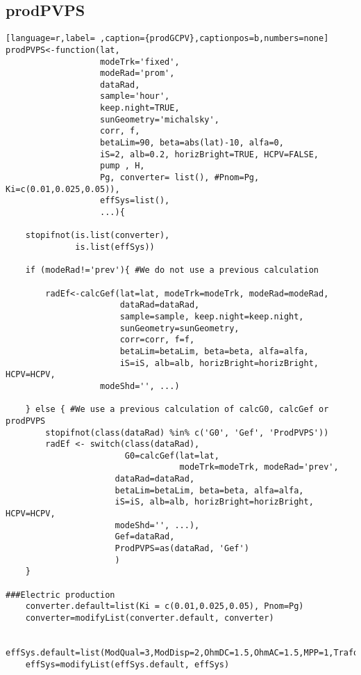 \subsection{prodPVPS}
\label{sec:org78cfe13}
\label{subsec:prodpvps}
\begin{lstlisting}[language=r,label= ,caption={prodGCPV},captionpos=b,numbers=none]
prodPVPS<-function(lat, 
                   modeTrk='fixed', 
                   modeRad='prom', 
                   dataRad,
                   sample='hour',
                   keep.night=TRUE,
                   sunGeometry='michalsky',
                   corr, f,
                   betaLim=90, beta=abs(lat)-10, alfa=0,
                   iS=2, alb=0.2, horizBright=TRUE, HCPV=FALSE,
                   pump , H, 
                   Pg, converter= list(), #Pnom=Pg, Ki=c(0.01,0.025,0.05)),
                   effSys=list(),
                   ...){

    stopifnot(is.list(converter),
              is.list(effSys))

    if (modeRad!='prev'){ #We do not use a previous calculation

        radEf<-calcGef(lat=lat, modeTrk=modeTrk, modeRad=modeRad,
                       dataRad=dataRad,
                       sample=sample, keep.night=keep.night,
                       sunGeometry=sunGeometry,
                       corr=corr, f=f,
                       betaLim=betaLim, beta=beta, alfa=alfa,
                       iS=iS, alb=alb, horizBright=horizBright, HCPV=HCPV,
                   modeShd='', ...)

    } else { #We use a previous calculation of calcG0, calcGef or prodPVPS
        stopifnot(class(dataRad) %in% c('G0', 'Gef', 'ProdPVPS'))
        radEf <- switch(class(dataRad),
                        G0=calcGef(lat=lat, 
                                   modeTrk=modeTrk, modeRad='prev',
                      dataRad=dataRad,
                      betaLim=betaLim, beta=beta, alfa=alfa,
                      iS=iS, alb=alb, horizBright=horizBright, HCPV=HCPV,
                      modeShd='', ...),
                      Gef=dataRad,
                      ProdPVPS=as(dataRad, 'Gef')
                      )
    }

###Electric production
    converter.default=list(Ki = c(0.01,0.025,0.05), Pnom=Pg)
    converter=modifyList(converter.default, converter)

    effSys.default=list(ModQual=3,ModDisp=2,OhmDC=1.5,OhmAC=1.5,MPP=1,TrafoMT=1,Disp=0.5)
    effSys=modifyList(effSys.default, effSys)


\end{lstlisting}
